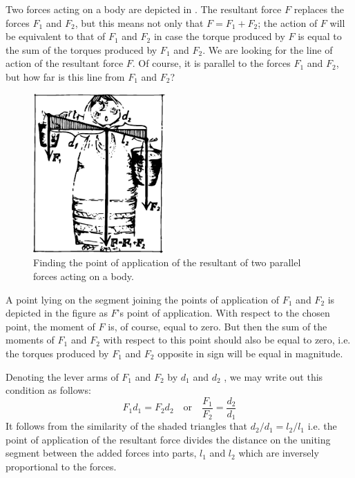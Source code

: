 Two forces acting on a body are depicted in .
The resultant force $F$ replaces the forces $F_{1}$ and $F_{2}$, but
this means not only that  $F = F_{1} +F_{2}$; the action of $F$ will be equivalent to that of $F_{1}$ and $F_{2}$ in case the
torque produced by $F$ is equal to the sum of the torques
produced by $F_{1}$ and $F_{2}$.
We are looking for the line of action of the resultant
force $F$. Of course, it is parallel to the forces $F_{1}$ and $F_{2}$,
but how far is this line from $F_{1}$ and $F_{2}$?
 \begin{figure}[!ht]
 \centering
 \includegraphics[width=0.45\textwidth]{figures/fig-5-06.pdf}
 \caption{Finding the point of application of the resultant of two parallel forces acting on a body.}
 \label{fig-5-06}
 \end{figure}

A point lying on the segment joining the points of application of $F_{1}$ and $F_{2}$ is depicted in the figure as $F$'s
point of application. With respect to the chosen point, the moment of $F$ is, of course, equal to zero. But then the
sum of the moments of $F_{1}$ and $F_{2}$ with respect to this point should also be equal to zero, i.e. the torques produced by $F_{1}$ and $F_{2}$ opposite in sign will be equal in magnitude.

Denoting the lever arms of $F_{1}$ and $F_{2}$ by $d_{1}$ and $d_{2}$ , we may write out this condition as follows:
\begin{equation*}%
F_{1} d_{1} = F_{2} d_{2} \quad \textrm{or} \quad \dfrac{F_{1}}{F_{2}} = \dfrac{d_{2}}{d_{1}}
\end{equation*}
It follows from the similarity of the shaded triangles that $d_{2}/d_{1} = l_{2}/l_{1}$ i.e. the point of application of the
resultant force divides the distance on the uniting segment between the added forces into parts, $l_{1}$ and $l_{2}$
which are inversely proportional to the forces.


